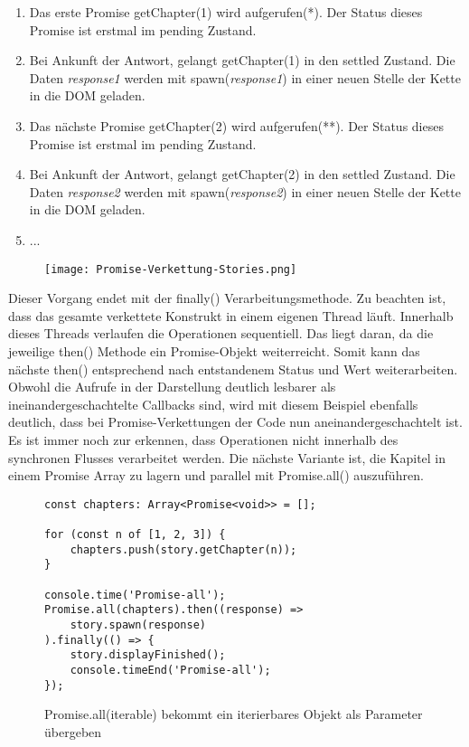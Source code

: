 \begin{enumerate}
    \item Das erste Promise getChapter(1) wird aufgerufen(*). Der Status dieses Promise ist erstmal im pending Zustand.
    \item Bei Ankunft der Antwort, gelangt getChapter(1) in den settled Zustand. Die Daten \textit{response1} werden mit spawn(\textit{response1}) in einer neuen Stelle der Kette in die DOM geladen.
    \item Das nächste Promise getChapter(2) wird aufgerufen(**). Der Status dieses Promise ist erstmal im pending Zustand. 
    \item Bei Ankunft der Antwort, gelangt getChapter(2) in den settled Zustand. Die Daten \textit{response2} werden mit spawn(\textit{response2}) in einer neuen Stelle der Kette in die DOM geladen.
    \item ...
\end{enumerate}

\begin{figure}[H]
\centering
\texttt{[image: Promise-Verkettung-Stories.png]}
\end{figure}

\noindent
Dieser Vorgang endet mit der finally() Verarbeitungsmethode. Zu beachten ist, dass das gesamte verkettete Konstrukt in einem eigenen Thread läuft. Innerhalb dieses Threads verlaufen die Operationen sequentiell. Das liegt daran, da die jeweilige then() Methode ein Promise-Objekt weiterreicht. Somit kann das nächste then() entsprechend nach entstandenem Status und Wert weiterarbeiten. Obwohl die Aufrufe in der Darstellung deutlich lesbarer als ineinandergeschachtelte Callbacks sind, wird mit diesem Beispiel ebenfalls deutlich, dass bei Promise-Verkettungen der Code nun aneinandergeschachtelt ist. Es ist immer noch zur erkennen, dass Operationen nicht innerhalb des synchronen Flusses verarbeitet werden. Die nächste Variante ist, die Kapitel in einem Promise Array zu lagern und parallel mit Promise.all() auszuführen.

\begin{figure}[H]
\begin{lstlisting}[basicstyle=\small]
const chapters: Array<Promise<void>> = [];

for (const n of [1, 2, 3]) {
    chapters.push(story.getChapter(n));
}

console.time('Promise-all');
Promise.all(chapters).then((response) =>
    story.spawn(response)
).finally(() => {
    story.displayFinished();
    console.timeEnd('Promise-all');
});
\end{lstlisting}
\caption{Promise.all(iterable) bekommt ein iterierbares Objekt als Parameter übergeben}
\label{Promise-all-example}
\end{figure}

